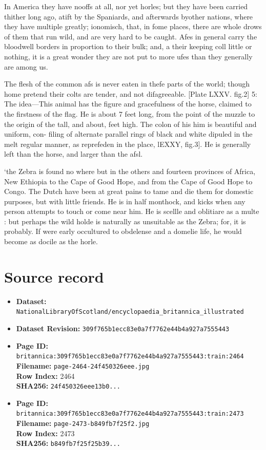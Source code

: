 \documentclass{article}
\begin{document}
In America they have nooffs at all, nor yet horles; but they have been carried thither long ago, atift by the Spaniards, and afterwards byother nations, where they have multiple greatly; ionomisch, that, in fome places, there are whole drows of them that run wild, and are very hard to be caught. Afes in general carry the bloodwell borders in proportion to their bulk; and, a their keeping coll little or nothing, it is a great wonder they are not put to more ufes than they generally are among us.

The flesh of the common afs is never eaten in thefe parts of the world; though home pretend their colts are tender, and not difagreeable. [Plate LXXV. fig.2] 5: The idea—This animal has the figure and gracefulness of the horse, claimed to the firstness of the flag. He is about 7 feet long, from the point of the muzzle to the origin of the tall, and about, feet high. The colon of his him is beautiful and uniform, con- filing of alternate parallel rings of black and white dipuled in the melt regular manner, as reprefeden in the place, lEXXY, fig.3]. He is generally left than the horse, and larger than the afsl.

‘the Zebra is found no where but in the others and fourteen provinces of Africa, New Ethiopia to the Cape of Good Hope, and from the Cape of Good Hope to Congo. The Dutch have been at great pains to tame and die them for domestic purposes, but with little friends. He is in half monthock, and kicks when any person attempts to touch or come near him. He is scellle and oblitiare as a multe : but perhaps the wild holde is naturally as unsuitable as the Zebra; for, it is probably. If were early occultured to obdelense and a domelie life, he would become as docile as the horle.



\section*{Source record}
\begin{itemize}
\item \textbf{Dataset:} \texttt{NationalLibraryOfScotland/encyclopaedia\_britannica\_illustrated}
\item \textbf{Dataset Revision:} \texttt{309f765b1ecc83e0a7f7762e44b4a927a7555443}
\item \textbf{Page ID:} \texttt{britannica:309f765b1ecc83e0a7f7762e44b4a927a7555443:train:2464} \\
  \textbf{Filename:} \texttt{page-2464-24f450326eee.jpg} \\
  \textbf{Row Index:} 2464 \\
  \textbf{SHA256:} \texttt{24f450326eee13b0...}
\item \textbf{Page ID:} \texttt{britannica:309f765b1ecc83e0a7f7762e44b4a927a7555443:train:2473} \\
  \textbf{Filename:} \texttt{page-2473-b849fb7f25f2.jpg} \\
  \textbf{Row Index:} 2473 \\
  \textbf{SHA256:} \texttt{b849fb7f25f25b39...}
\end{itemize}
\end{document}

